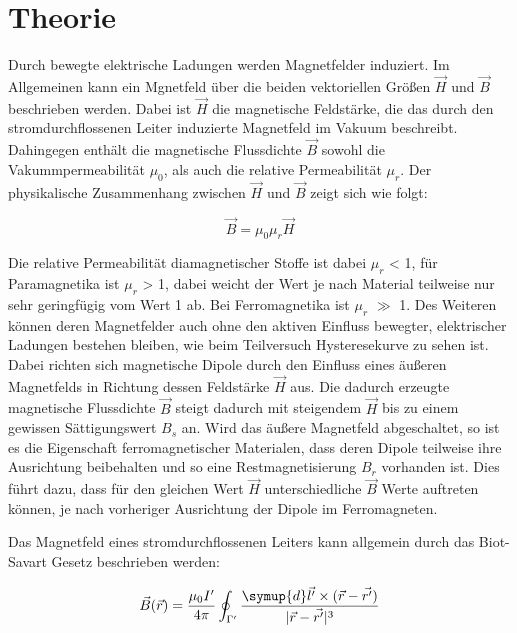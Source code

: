 \section{Theorie}
\label{sec:Theorie}



Durch bewegte elektrische Ladungen werden Magnetfelder induziert.
Im Allgemeinen kann ein Mgnetfeld über die beiden vektoriellen Größen 
$\vec H$ und $\vec B$ beschrieben werden. Dabei ist $\vec H$ die 
magnetische Feldstärke, die das durch den stromdurchflossenen Leiter induzierte 
Magnetfeld im Vakuum beschreibt. Dahingegen enthält die magnetische Flussdichte
$\vec B$ sowohl die Vakummpermeabilität $\mu_0$, als auch die relative Permeabilität
$\mu_r$. Der physikalische Zusammenhang zwischen $\vec H$ und $\vec B$ zeigt sich wie folgt:

\begin{equation}
    \label{eqn:hb}
    \vec B = \mu_0 \mu_r \vec H
\end{equation}

Die relative Permeabilität diamagnetischer Stoffe ist dabei $\mu_r$ < 1, für 
Paramagnetika ist $\mu_r$ > 1, dabei weicht der Wert je nach Material teilweise 
nur sehr geringfügig vom Wert 1 ab. Bei Ferromagnetika ist $\mu_r$ $\gg$ 1. Des Weiteren
können deren Magnetfelder auch ohne den aktiven Einfluss bewegter, elektrischer Ladungen
bestehen bleiben, wie beim Teilversuch Hysteresekurve zu sehen ist. Dabei richten sich 
magnetische Dipole durch den Einfluss 
eines äußeren Magnetfelds in Richtung dessen Feldstärke $\vec H$ aus. Die dadurch erzeugte magnetische
Flussdichte $\vec B$ steigt dadurch mit steigendem $\vec H$ bis zu einem gewissen Sättigungswert $B_s$
an. Wird das äußere Magnetfeld abgeschaltet, so ist es die Eigenschaft ferromagnetischer Materialen, dass
deren Dipole teilweise ihre Ausrichtung beibehalten und so eine Restmagnetisierung $B_r$ vorhanden ist.
Dies führt dazu, dass für den gleichen Wert $\vec H$ unterschiedliche $\vec B$ Werte auftreten können, je 
nach vorheriger Ausrichtung der Dipole im Ferromagneten. 


Das Magnetfeld eines stromdurchflossenen Leiters kann allgemein durch das Biot-Savart Gesetz
beschrieben werden:

\begin{equation}
    \label{eqn:biotsavart}
    \vec{B}(\vec r) = \frac{\mu_0 I'}{4\pi} \oint_{\Gamma'} \frac{\symup{d}\vec{l'}\times (\vec{r}-\vec{r'})}{\lvert\vec{r}-\vec{r'}\rvert^3}
\end{equation}

